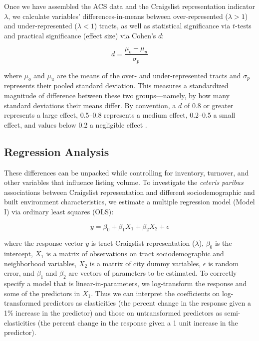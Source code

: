 \documentclass[11pt,letterpaper]{article}
\begin{document}
Once we have assembled the ACS data and the Craigslist representation indicator $\lambda$, we calculate variables' differences-in-means between over-represented ($\lambda>1$) and under-represented ($\lambda<1$) tracts, as well as statistical significance via $t$-tests and practical significance (effect size) via Cohen's $d$:

\begin{equation}
	\label{eq:cohen_d}
	d = \frac{\mu_o - \mu_u}{\sigma_p}
\end{equation}

where $\mu_o$ and $\mu_u$ are the means of the over- and under-represented tracts and $\sigma_p$ represents their pooled standard deviation. This measures a standardized magnitude of difference between these two groups---namely, by how many standard deviations their means differ. By convention, a $d$ of 0.8 or greater represents a large effect, 0.5--0.8 represents a medium effect, 0.2--0.5 a small effect, and values below 0.2 a negligible effect \citep{cohen_power_1992}.


\subsection{Regression Analysis}

These differences can be unpacked while controlling for inventory, turnover, and other variables that influence listing volume. To investigate the \textit{ceteris paribus} associations between Craigslist representation and different sociodemographic and built environment characteristics, we estimate a multiple regression model (Model I) via ordinary least squares (OLS):

\begin{equation}
	\label{eq:regression_formula}
	y = \beta_0 + \beta_1 X_1 + \beta_2 X_2 + \epsilon
\end{equation}

where the response vector $y$ is tract Craigslist representation ($\lambda$), $\beta_0$ is the intercept, $X_1$ is a matrix of observations on tract sociodemographic and neighborhood variables, $X_2$ is a matrix of city dummy variables, $\epsilon$ is random error, and $\beta_1$ and $\beta_2$ are vectors of parameters to be estimated. To correctly specify a model that is linear-in-parameters, we log-transform the response and some of the predictors in $X_1$. Thus we can interpret the coefficients on log-transformed predictors as elasticities (the percent change in the response given a 1\% increase in the predictor) and those on untransformed predictors as semi-elasticities (the percent change in the response given a 1 unit increase in the predictor).
\end{document}
